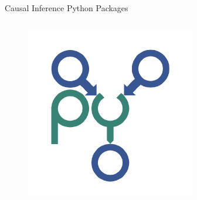 \documentclass[aspectratio=169]{beamer}
\begin{document}
\begin{frame}{Causal Inference Python Packages}
\begin{columns}
\begin{column}[T]{0.5 \textwidth}
\begin{itemize}
\begin{figure}
						\includegraphics[scale=0.2]{imgs/pywhy_logo.png}
					\end{figure}
			\end{itemize}
		\end{column}
	\end{columns}
\end{frame}
\end{document}
